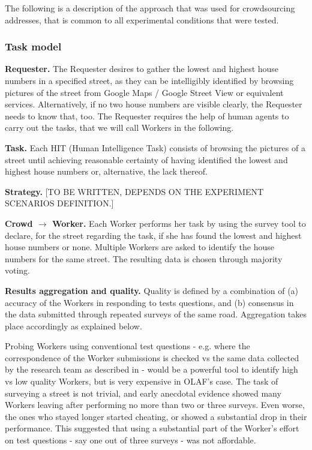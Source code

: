     The following is a description of the approach that was used for crowdsourcing addresses, that is common to all experimental conditions that were tested.

    \subsubsection{Task model}

        \textbf{Requester.} The Requester desires to gather the lowest and highest house numbers in a specified street, as they can be intelligibly identified by browsing pictures of the street from Google Maps / Google Street View or equivalent services. Alternatively, if no two house numbers are visible clearly, the Requester needs to know that, too. The Requester requires the help of human agents to carry out the tasks, that we will call Workers in the following.
        
        \textbf{Task.} Each HIT (Human Intelligence Task) consists of browsing the pictures of a street until achieving reasonable certainty of having identified the lowest and highest house numbers or, alternative, the lack thereof.
        
        \textbf{Strategy.} 
        {[}TO BE WRITTEN, DEPENDS ON THE EXPERIMENT SCENARIOS DEFINITION.{]}
        
        \textbf{Crowd $\rightarrow$ Worker.} Each Worker performs her task by using the survey tool to declare, for the street regarding the task, if she has found the lowest and highest house numbers or none. Multiple Workers are asked to identify the house numbers for the same street. The resulting data is chosen through majority voting.
    
        \textbf{Results aggregation and quality.} Quality is defined by a combination of (a) accuracy of the Workers in responding to tests questions, and (b) consensus in the data submitted through repeated surveys of the same road. Aggregation takes place accordingly as explained below.
        
        Probing Workers using conventional test questions - e.g. where the correspondence of the Worker submissions is checked vs the same data collected by the research team as described in \cite{Kittur:2008gj} - would be a powerful tool to identify high vs low quality Workers, but is very expensive in OLAF's case. The task of surveying a street is not trivial, and early anecdotal evidence showed many Workers leaving after performing no more than two or three surveys. Even worse, the ones who stayed longer started cheating, or showed a substantial drop in their performance. This suggested that using a substantial part of the Worker's effort on test questions - say one out of three surveys - was not affordable.
        
